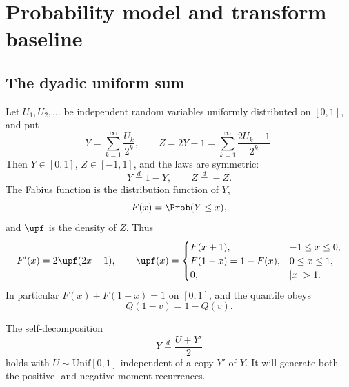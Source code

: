 \documentclass[11pt,oneside]{article}
\theoremstyle{definition}
\theoremstyle{remark}
\newcommand{\F}{F}
\newcommand{\Q}{Q}
\newcommand{\1}{\mathbf 1}
\begin{document}
\section{Probability model and transform baseline}

\subsection{The dyadic uniform sum}

Let \(U_1,U_2,\ldots\) be independent random variables uniformly distributed on
\([0,1]\), and put
\begin{equation}\label{p4:eq:Ydef}
 Y=\sum_{k=1}^{\infty}\frac{U_k}{2^k},
 \qquad
 Z=2Y-1=\sum_{k=1}^{\infty}\frac{2U_k-1}{2^k}.
\end{equation}
Then \(Y\in[0,1]\), \(Z\in[-1,1]\), and the laws are symmetric:
\begin{equation}\label{p4:eq:symmetry-laws}
 Y\overset d=1-Y,
 \qquad Z\overset d=-Z.
\end{equation}
The Fabius function is the distribution function of \(Y\),
\begin{equation}\label{p4:eq:Fdist}
 \F(x)=\Prob(Y\le x),
\end{equation}
and \(\upf\) is the density of \(Z\).  Thus
\begin{equation}\label{p4:eq:F-up-relations}
 \F'(x)=2\upf(2x-1),\qquad
 \upf(x)=
 \begin{cases}
   \F(x+1),&-1\le x\le0,\\
   \F(1-x)=1-\F(x),&0\le x\le1,\\
   0,&|x|>1.
 \end{cases}
\end{equation}
In particular \(\F(x)+\F(1-x)=1\) on \([0,1]\), and the quantile obeys
\begin{equation}\label{p4:eq:Qsymmetry}
 \Q(1-v)=1-\Q(v).
\end{equation}

The self-decomposition
\begin{equation}\label{p4:eq:smoothing}
 Y\overset d=\frac{U+Y'}2
\end{equation}
holds with \(U\sim\mathrm{Unif}[0,1]\) independent of a copy \(Y'\) of \(Y\).
It will generate both the positive- and negative-moment recurrences.
\end{document}

